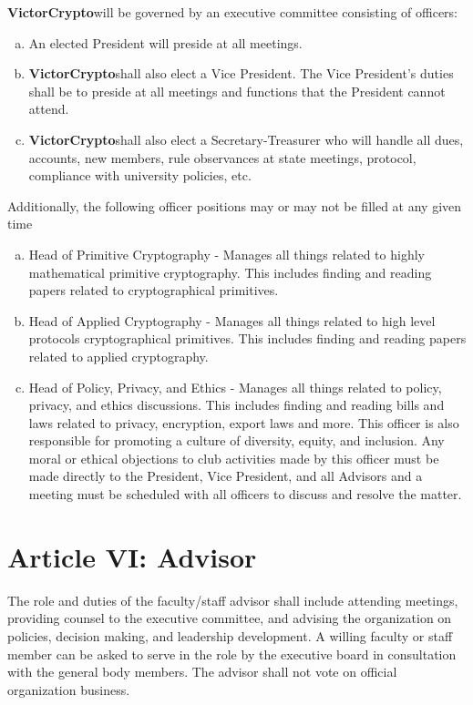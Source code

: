 \documentclass[11pt]{article}
\newcommand{\orgname}{\textbf{VictorCrypto}}
\begin{document}
    \orgname will be governed by an executive committee consisting of officers:

    \begin{enumerate}
        [a)]
        \item An elected President will preside at all meetings.
        \item \orgname shall also elect a Vice President.
        The Vice President's duties shall be to preside at all meetings and functions that the President cannot attend.
        \item \orgname shall also elect a Secretary-Treasurer who will handle all dues, accounts, new members, rule observances at state meetings, protocol, compliance with university policies, etc.
    \end{enumerate}

    Additionally, the following officer positions may or may not be filled at any given time

    \begin{enumerate}
        [a)]
        \item Head of Primitive Cryptography - Manages all things related to highly mathematical primitive cryptography.
        This includes finding and reading papers related to cryptographical primitives.
        \item Head of Applied Cryptography - Manages all things related to high level protocols cryptographical primitives.
        This includes finding and reading papers related to applied cryptography.
        \item Head of Policy, Privacy, and Ethics -  Manages all things related to policy, privacy, and ethics discussions.
        This includes finding and reading bills and laws related to privacy, encryption, export laws and more.
        This officer is also responsible for promoting a culture of diversity, equity, and inclusion.
        Any moral or ethical objections to club activities made by this officer must be made directly to the
        President, Vice President, and all Advisors and a meeting must be scheduled with all officers to discuss and
        resolve the matter.
    \end{enumerate}


    \section{Article VI: Advisor}

    The role and duties of the faculty/staff advisor shall include attending meetings, providing counsel to the executive committee, and advising the organization on policies, decision making, and leadership development.
    A willing faculty or staff member can be asked to serve in the role by the executive board in consultation with the general body members.
    The advisor shall not vote on official organization business.
\end{document}
